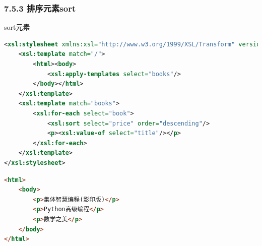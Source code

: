 \subsubsection{7.5.3 排序元素sort}
\begin{frame}{sort元素}
\begin{lstlisting}[tabsize=8, basicstyle=\small\tt, language=XML, caption=样式文档]
<xsl:stylesheet xmlns:xsl="http://www.w3.org/1999/XSL/Transform" version="2.0">
    <xsl:template match="/">
        <html><body>
            <xsl:apply-templates select="books"/>
        </body></html>
    </xsl:template>
    <xsl:template match="books">
        <xsl:for-each select="book">
            <xsl:sort select="price" order="descending"/>
            <p><xsl:value-of select="title"/></p>
        </xsl:for-each>
    </xsl:template>
</xsl:stylesheet>
\end{lstlisting}

\begin{lstlisting}[tabsize=8, basicstyle=\small\tt, language=HTML, caption=转换结果]
<html>
    <body>
        <p>集体智慧编程(影印版)</p>
        <p>Python高级编程</p>
        <p>数学之美</p>
    </body>
</html>
\end{lstlisting}
\end{frame}



